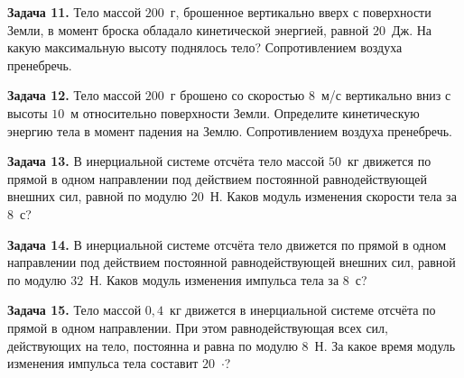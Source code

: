 \begin{taskbasic}[code={\label{task:dem26_v11_n3}}]
\textbf{Задача 11.} Тело массой $200$~г, брошенное вертикально вверх с поверхности Земли, в момент броска обладало кинетической энергией, равной $20$~Дж. На какую максимальную высоту поднялось тело? Сопротивлением воздуха пренебречь.

\end{taskbasic}

\begin{taskbasic}[code={\label{task:dem26_v12_n3}}]
\textbf{Задача 12.} Тело массой $200$~г брошено со скоростью $8$~м/с вертикально вниз с высоты $10$~м относительно поверхности Земли. Определите кинетическую энергию тела в момент падения на Землю. Сопротивлением воздуха пренебречь.

\end{taskbasic}

\begin{taskbasic}[code={\label{task:dem26_v13_n3}}]
\textbf{Задача 13.} В инерциальной системе отсчёта тело массой $50$~кг движется по прямой в одном направлении под действием постоянной равнодействующей внешних сил, равной по модулю $20$~Н. Каков модуль изменения скорости тела за $8$~с?

\end{taskbasic}

\begin{taskbasic}[code={\label{task:dem26_v14_n3}}]
\textbf{Задача 14.} В инерциальной системе отсчёта тело движется по прямой в одном направлении под действием постоянной равнодействующей внешних сил, равной по модулю $32$~Н. Каков модуль изменения импульса тела за $8$~с?

\end{taskbasic}

\begin{taskbasic}[code={\label{task:dem26_v15_n3}}]
\textbf{Задача 15.} Тело массой $0{,}4$~кг движется в инерциальной системе отсчёта по прямой в одном направлении. При этом равнодействующая всех сил, действующих на тело, постоянна и равна по модулю $8$~Н. За какое время модуль изменения импульса тела составит $20$~$\cdot$?

\end{taskbasic}


